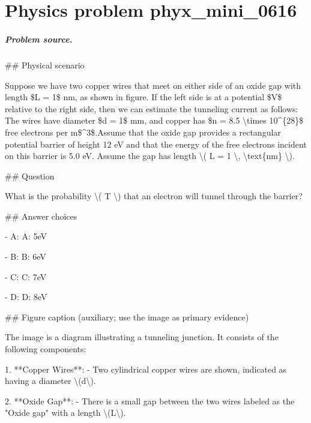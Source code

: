 
\chapter{Physics problem phyx\_mini\_0616}
\label{ch:PhyXMiniProblems_problem_phyx_mini_0616}

\paragraph{Problem source.}
\#\# Physical scenario

Suppose we have two copper wires that meet on either side of an oxide gap with length \$L = 1\$ nm, as shown in figure. If the left side is at a potential \$V\$ relative to the right side, then we can estimate the tunneling current as follows: The wires have diameter \$d = 1\$ mm, and copper has \$n = 8.5 \textbackslash{}times 10\textasciicircum{}\{28\}\$ free electrons per m\$\textasciicircum{}3\$.Assume that the oxide gap provides a rectangular potential barrier of height 12 eV and that the energy of the free electrons incident on this barrier is 5.0 eV. Assume the gap has length \textbackslash{}( L = 1 \textbackslash{}, \textbackslash{}text\{nm\} \textbackslash{}).

\#\# Question

What is the probability \textbackslash{}( T \textbackslash{}) that an electron will tunnel through the barrier?

\#\# Answer choices

- A: A: 5eV

- B: B: 6eV

- C: C: 7eV

- D: D: 8eV

\#\# Figure caption (auxiliary; use the image as primary evidence)

The image is a diagram illustrating a tunneling junction. It consists of the following components:

1. **Copper Wires**:
   - Two cylindrical copper wires are shown, indicated as having a diameter \textbackslash{}(d\textbackslash{}).

2. **Oxide Gap**:
   - There is a small gap between the two wires labeled as the "Oxide gap" with a length \textbackslash{}(L\textbackslash{}).

